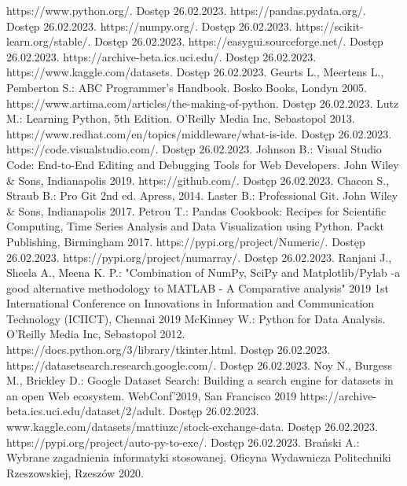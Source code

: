\documentclass[12pt,twoside]{article}
\begin{document}

\clearpage



\begin{thebibliography}{4}
     https://www.python.org/. Dostęp 26.02.2023.
     https://pandas.pydata.org/. Dostęp 26.02.2023.
     https://numpy.org/. Dostęp 26.02.2023.
     https://scikit-learn.org/stable/. Dostęp 26.02.2023.
     https://easygui.sourceforge.net/. Dostęp 26.02.2023.
     https://archive-beta.ics.uci.edu/. Dostęp 26.02.2023.
     https://www.kaggle.com/datasets. Dostęp 26.02.2023.
     Geurts L., Meertens L., Pemberton S.: ABC Programmer's Handbook. Bosko Books, Londyn 2005.
     https://www.artima.com/articles/the-making-of-python. Dostęp 26.02.2023.
     Lutz M.: Learning Python, 5th Edition. O'Reilly Media Inc, Sebastopol 2013.
     https://www.redhat.com/en/topics/middleware/what-is-ide. Dostęp 26.02.2023.
     https://code.visualstudio.com/. Dostęp 26.02.2023.
     Johnson B.: Visual Studio Code: End-to-End Editing and Debugging Tools for Web Developers. John Wiley \& Sons, Indianapolis 2019.
     https://github.com/. Dostęp 26.02.2023.
     Chacon S., Straub B.: Pro Git 2nd ed. Apress, 2014.
     Laster B.: Professional Git. John Wiley \& Sons, Indianapolis 2017.
     Petrou T.: Pandas Cookbook: Recipes for Scientific Computing, Time Series Analysis and Data Visualization using Python. Packt Publishing, Birmingham 2017.
     https://pypi.org/project/Numeric/. Dostęp 26.02.2023.
     https://pypi.org/project/numarray/. Dostęp 26.02.2023.
     Ranjani J., Sheela A., Meena K. P.: "Combination of NumPy, SciPy and Matplotlib/Pylab -a good alternative methodology to MATLAB - A Comparative analysis" 2019 1st International Conference on Innovations in Information and Communication Technology (ICIICT), Chennai 2019
     McKinney W.: Python for Data Analysis. O'Reilly Media Inc, Sebastopol 2012.
     https://docs.python.org/3/library/tkinter.html. Dostęp 26.02.2023.
     https://datasetsearch.research.google.com/. Dostęp 26.02.2023.
     Noy N., Burgess M., Brickley D.: Google Dataset Search: Building a search engine for datasets in an open Web ecosystem. WebConf'2019, San Francisco 2019
     https://archive-beta.ics.uci.edu/dataset/2/adult. Dostęp 26.02.2023.
     www.kaggle.com/datasets/mattiuzc/stock-exchange-data. Dostęp 26.02.2023.
     https://pypi.org/project/auto-py-to-exe/. Dostęp 26.02.2023.
     Brański A.: Wybrane zagadnienia informatyki stosowanej. Oficyna Wydawnicza Politechniki Rzeszowskiej, Rzeszów 2020.
\end{thebibliography}

\clearpage


\makesummary
\end{document}
